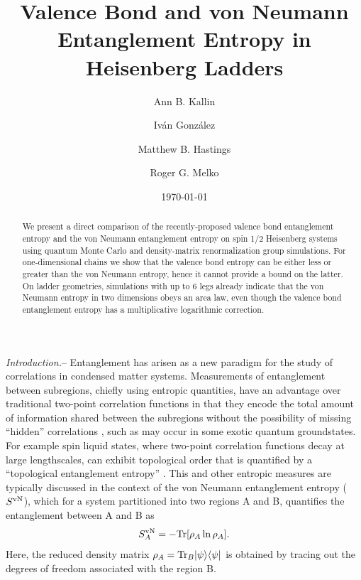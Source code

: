 \documentclass[prl,aps,twocolumn,floatfix,amsmath,amssymb,superscriptaddress,tightenlines]{revtex4}
\begin{document}
\date{\today}
\title{Valence Bond and von Neumann Entanglement Entropy in Heisenberg Ladders}
\author{Ann B. Kallin}

\author{Iv\'an Gonz\'alez}

\author{Matthew B. Hastings}

\author{Roger G. Melko}

\begin{abstract} We present a direct comparison of the recently-proposed
valence bond entanglement entropy and the von Neumann entanglement entropy on
spin 1/2 Heisenberg systems using quantum Monte Carlo and density-matrix
renormalization group simulations.  For one-dimensional chains we
show that the valence bond entropy can be either less or greater than the
von Neumann entropy, hence it cannot provide a bound on the latter.  
On ladder geometries, simulations with up to 6 legs already indicate that
the von Neumann entropy in two dimensions obeys an area law,
even though the valence bond entanglement entropy 
has a multiplicative logarithmic correction.
\end{abstract}
\maketitle


{\it Introduction.}-- Entanglement has arisen 
as a new paradigm for the study of correlations in condensed matter systems.  
Measurements
of entanglement between subregions, chiefly using entropic
quantities, have an advantage over traditional two-point correlation
functions in that they encode the total amount of information shared
between the subregions without the possibility of missing ``hidden''
correlations \cite{wolf},
such as may occur in some exotic quantum groundstates.   For example spin liquid states, 
where two-point correlation functions decay at large lengthscales, can exhibit topological order that is quantified by a ``topological entanglement
entropy''  \cite{ KP}.
This and other entropic measures are typically discussed in the context of
the von Neumann entanglement entropy ($S^{\rm vN}$), which for a system partitioned into
two regions A and B, quantifies the entanglement between A and B as
\begin{equation} 
S^{\rm vN}_A = - {\rm Tr} [ \rho_A \ln \rho_A ]. \label{vNEE} 
\end{equation}
Here, the reduced density matrix $\rho_A = {\rm Tr}_B | \psi \rangle
\langle \psi |$ is obtained by tracing out the degrees of freedom
associated with the region B.
\end{document}

